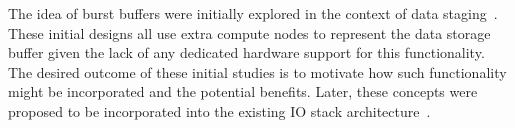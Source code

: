 \documentclass[conference]{IEEEtran}
\begin{document}
The idea of burst buffers were initially explored in the context of data
staging~\cite{abbasi:2007:datatap,Abbasi:2009:datatap,nisar:2008:staging,zheng:2010:predata}.
These initial designs all use extra compute nodes to represent the data storage
buffer given the lack of any dedicated hardware support for this functionality.
The desired outcome of these initial studies is to motivate how such
functionality might be incorporated and the potential benefits.  Later, these
concepts were proposed to be incorporated into the existing IO stack
architecture~\cite{nowoczynski:2008:zest,bent:2012:challenges,bent:2012:burst-buffer}.

%
\end{document}
